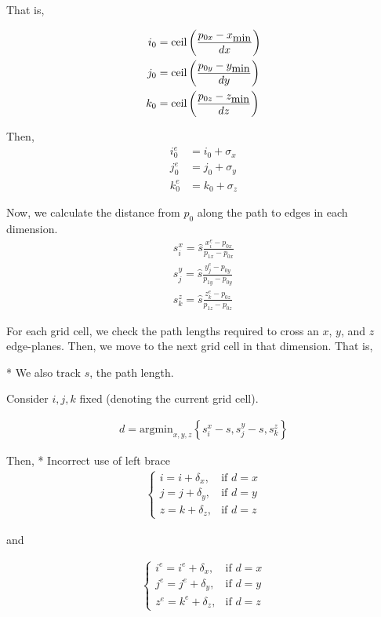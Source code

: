 That is,

\begin{align}
  i_0 &= \mbox{ceil}\left(\frac{p_{0x}-x_{\mbox{min}}}{dx}\right) \\
  j_0 &= \mbox{ceil}\left(\frac{p_{0y}-y_{\mbox{min}}}{dy}\right) \\
  k_0 &= \mbox{ceil}\left(\frac{p_{0z}-z_{\mbox{min}}}{dz}\right)
\end{align}

Then,
\begin{align}
  i_0^e &= i_0 + \sigma_x \\
  j_0^e &= j_0 + \sigma_y \\
  k_0^e &= k_0 + \sigma_z
\end{align}

Now, we calculate the distance from $p_0$ along the path to edges in each dimension.
\begin{align}
  s_i^x = \hat{s}\frac{x_i^e-p_{0x}}{p_{1x}-p_{0x}} \\
  s_j^y = \hat{s}\frac{y_j^e-p_{0y}}{p_{1y}-p_{0y}} \\
  s_k^z = \hat{s}\frac{z_k^e-p_{0z}}{p_{1z}-p_{0z}}
\end{align}

For each grid cell, we check the path lengths required to cross an $x$, $y$, and
$z$ edge-planes.
Then, we move to the next grid cell in that dimension.
That is,

* We also track $s$, the path length.

Consider $i,j,k$ fixed (denoting the current grid cell).

\begin{align}  
  d = \mbox{argmin}_{x,y,z} \left\{ s_i^x-s, s_j^y-s, s_k^z \right\}
\end{align}

Then,
* Incorrect use of left brace
\begin{align}
  \begin{cases}
    i = i+\delta_x, & \mbox{if } d=x \\
    j = j+\delta_y, & \mbox{if } d=y \\
    z = k+\delta_z, & \mbox{if } d=z
  \end{cases}
\end{align}

and

\begin{align}
  \begin{cases}
    i^e = i^e+\delta_x, & \mbox{if } d=x \\
    j^e = j^e+\delta_y, & \mbox{if } d=y \\
    z^e = k^e+\delta_z, & \mbox{if } d=z
  \end{cases}
\end{align}


